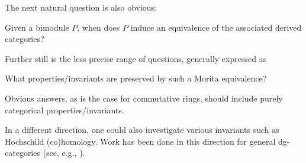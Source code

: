 \documentclass[reqno, 12pt]{amsart}
\begin{document}
The next natural question is also obvious:
\begin{question}
  Given a bimodule $P$, when does $P$ induce an equivalence of the associated derived categories?
\end{question}
Further still is the less precise range of questions, generally expressed as
\begin{question}
  What properties/invariants are preserved by such a Morita equivalence?
\end{question}
Obvious answers, as is the case for commutative rings, should include purely categorical properties/invariants.

In a different direction, one could also investigate various invariants such as Hochschild (co)homology.
Work has been done in this direction for general dg-categories (see, e.g., \cite{Kel06}).
\end{document}
